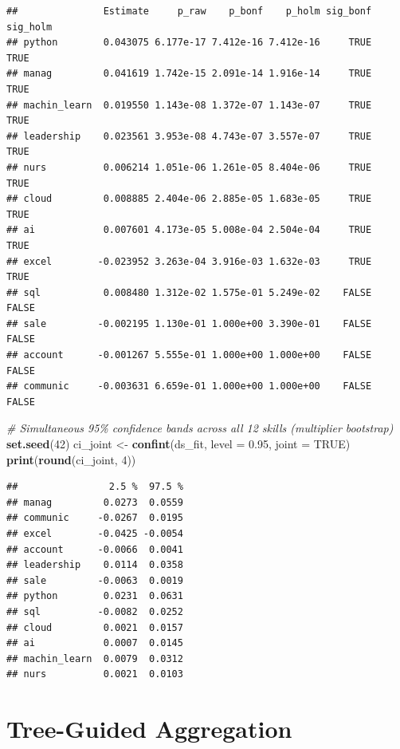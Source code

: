 \documentclass[
]{article}
\newenvironment{Shaded}{\begin{snugshade}}{\end{snugshade}}
\newcommand{\AttributeTok}[1]{\textcolor[rgb]{0.13,0.29,0.53}{#1}}
\newcommand{\CommentTok}[1]{\textcolor[rgb]{0.56,0.35,0.01}{\textit{#1}}}
\newcommand{\ConstantTok}[1]{\textcolor[rgb]{0.56,0.35,0.01}{#1}}
\newcommand{\DecValTok}[1]{\textcolor[rgb]{0.00,0.00,0.81}{#1}}
\newcommand{\FloatTok}[1]{\textcolor[rgb]{0.00,0.00,0.81}{#1}}
\newcommand{\FunctionTok}[1]{\textcolor[rgb]{0.13,0.29,0.53}{\textbf{#1}}}
\newcommand{\NormalTok}[1]{#1}
\newcommand{\OtherTok}[1]{\textcolor[rgb]{0.56,0.35,0.01}{#1}}
\begin{document}
\begin{verbatim}
##               Estimate     p_raw    p_bonf    p_holm sig_bonf sig_holm
## python        0.043075 6.177e-17 7.412e-16 7.412e-16     TRUE     TRUE
## manag         0.041619 1.742e-15 2.091e-14 1.916e-14     TRUE     TRUE
## machin_learn  0.019550 1.143e-08 1.372e-07 1.143e-07     TRUE     TRUE
## leadership    0.023561 3.953e-08 4.743e-07 3.557e-07     TRUE     TRUE
## nurs          0.006214 1.051e-06 1.261e-05 8.404e-06     TRUE     TRUE
## cloud         0.008885 2.404e-06 2.885e-05 1.683e-05     TRUE     TRUE
## ai            0.007601 4.173e-05 5.008e-04 2.504e-04     TRUE     TRUE
## excel        -0.023952 3.263e-04 3.916e-03 1.632e-03     TRUE     TRUE
## sql           0.008480 1.312e-02 1.575e-01 5.249e-02    FALSE    FALSE
## sale         -0.002195 1.130e-01 1.000e+00 3.390e-01    FALSE    FALSE
## account      -0.001267 5.555e-01 1.000e+00 1.000e+00    FALSE    FALSE
## communic     -0.003631 6.659e-01 1.000e+00 1.000e+00    FALSE    FALSE
\end{verbatim}

\begin{Shaded}
\begin{Highlighting}[]
\CommentTok{\# Simultaneous 95\% confidence bands across all 12 skills (multiplier bootstrap)}
\FunctionTok{set.seed}\NormalTok{(}\DecValTok{42}\NormalTok{)}
\NormalTok{ci\_joint }\OtherTok{\textless{}{-}} \FunctionTok{confint}\NormalTok{(ds\_fit, }\AttributeTok{level =} \FloatTok{0.95}\NormalTok{, }\AttributeTok{joint =} \ConstantTok{TRUE}\NormalTok{)}
\FunctionTok{print}\NormalTok{(}\FunctionTok{round}\NormalTok{(ci\_joint, }\DecValTok{4}\NormalTok{))}
\end{Highlighting}
\end{Shaded}

\begin{verbatim}
##                2.5 %  97.5 %
## manag         0.0273  0.0559
## communic     -0.0267  0.0195
## excel        -0.0425 -0.0054
## account      -0.0066  0.0041
## leadership    0.0114  0.0358
## sale         -0.0063  0.0019
## python        0.0231  0.0631
## sql          -0.0082  0.0252
## cloud         0.0021  0.0157
## ai            0.0007  0.0145
## machin_learn  0.0079  0.0312
## nurs          0.0021  0.0103
\end{verbatim}

\section{Tree-Guided Aggregation}\label{tree-guided-aggregation}
\end{document}
